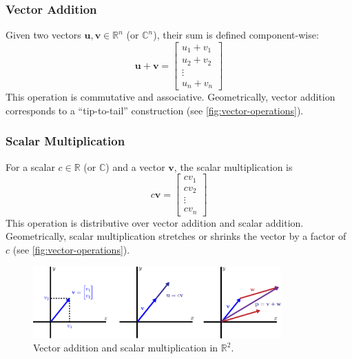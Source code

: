 \subsubsection{Vector Addition}
Given two vectors $ \mathbf{u}, \mathbf{v} \in \mathbb{R}^n $ (or $ \mathbb{C}^n $), their sum is defined component-wise:
\begin{equation*}
    \mathbf{u} + \mathbf{v} = \begin{bmatrix} u_1 + v_1 \\ u_2 + v_2 \\ \vdots \\ u_n + v_n \end{bmatrix}
\end{equation*}
This operation is commutative and associative. Geometrically, vector addition corresponds to a ``tip-to-tail'' construction (see \autoref{fig:vector-operations}).

\subsubsection{Scalar Multiplication}
For a scalar $ c \in \mathbb{R} $ (or $ \mathbb{C} $) and a vector $ \mathbf{v} $, the scalar multiplication is
\begin{equation*}
    c\mathbf{v} = \begin{bmatrix} c v_1 \\ c v_2 \\ \vdots \\ c v_n \end{bmatrix}
\end{equation*}
This operation is distributive over vector addition and scalar addition. Geometrically, scalar multiplication stretches or shrinks the vector by a factor of $ c $ (see \autoref{fig:vector-operations}).

\begin{figure}[H]
    \centering
    \includegraphics[width=0.85\textwidth]{figs/linear-algebra/vector-operations.pdf}
    \caption{Vector addition and scalar multiplication in $ \mathbb{R}^2 $.}
    \label{fig:vector-operations}
\end{figure}

